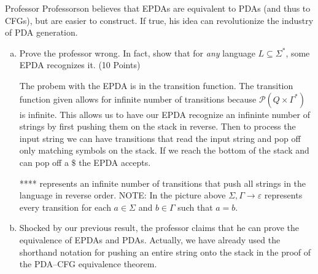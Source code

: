 \documentclass{article}
\begin{document}
    Professor Professorson believes that EPDAs are equivalent to PDAs (and thus to CFGs), but are easier to construct. If true, his idea can revolutionize the industry of PDA generation.
\begin{enumerate}[(a)]
    \item Prove the professor wrong. In fact, show that for \textit{any} language
    $L\subseteq\Sigma^*$, some EPDA recognizes it. (10 Points)

    The probem with the EPDA is in the transition function. The transition function given allows
    for infinite number of transitions because $\mathcal{P}(Q \times \Gamma^*)$ is infinite.
    This allows us to have our EPDA recognize an infininte number of strings by first pushing
    them on the stack in reverse. Then to process the input string we can have transitions
    that read the input string and pop off only matching symbols on the stack. If we reach the
    bottom of the stack and can pop off a $\$$ the EPDA accepts.


    **** represents an infinite number of transitions that push all strings in the language
    in reverse order.
    NOTE: In the picture above $\Sigma, \Gamma \rightarrow \varepsilon$ represents every
    transition for each $a \in \Sigma$ and $b \in \Gamma$ such that $a = b$.

    \item Shocked by our previous result, the professor claims that he can prove the equivalence
    of EPDAs and PDAs. Actually, we have already used the shorthand notation for pushing an
    entire string onto the stack in the proof of the PDA--CFG equivalence theorem.


\end{enumerate}
\end{document}
